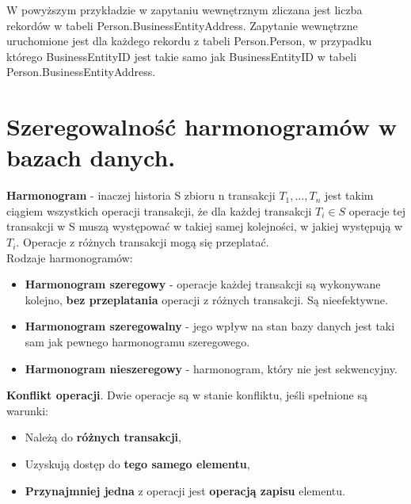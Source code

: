 \documentclass[main.tex]{subfiles}
\begin{document}
    W powyższym przykładzie w zapytaniu wewnętrznym zliczana jest liczba rekordów w tabeli Person.BusinessEntityAddress. Zapytanie wewnętrzne uruchomione jest dla każdego rekordu z tabeli Person.Person, w przypadku którego BusinessEntityID jest takie samo jak BusinessEntityID w tabeli Person.BusinessEntityAddress.

    \newpage

    \section{Szeregowalność harmonogramów w bazach danych.}

    \begin{definition}
        \textbf{Harmonogram} - inaczej historia S zbioru n transakcji $T_1, \dots, T_n$ jest takim ciągiem wszystkich
        operacji transakcji, że dla każdej transakcji $T_i \in S$ operacje tej transakcji w S muszą występować w takiej samej
        kolejności, w jakiej występują w $T_i$. Operacje z różnych transakcji mogą się przeplatać.\\

        Rodzaje harmonogramów:
        \begin{itemize}
            \item \textbf{Harmonogram szeregowy} - operacje każdej transakcji są wykonywane kolejno, \textbf{bez przeplatania}
            operacji z różnych transakcji. Są nieefektywne.
            \item \textbf{Harmonogram szeregowalny} - jego wpływ na stan bazy danych jest taki sam jak pewnego
            harmonogramu szeregowego.
            \item \textbf{Harmonogram nieszeregowy} - harmonogram, który nie jest sekwencyjny.
        \end{itemize}
    \end{definition}

    \begin{definition}
        \textbf{Konflikt operacji}. Dwie operacje są w stanie konfliktu, jeśli spełnione są warunki:
        \begin{itemize}
            \item Należą do \textbf{różnych transakcji},
            \item Uzyskują dostęp do \textbf{tego samego elementu},
            \item \textbf{Przynajmniej jedna} z operacji jest \textbf{operacją zapisu} elementu.
        \end{itemize}
    \end{definition}
\end{document}
